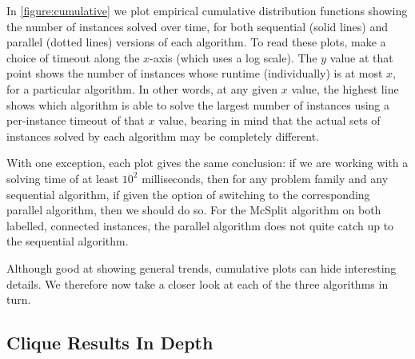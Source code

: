 \documentclass{llncs}
\begin{document}
In \cref{figure:cumulative} we plot empirical cumulative distribution functions showing the number
of instances solved over time, for both sequential (solid lines) and parallel (dotted lines)
versions of each algorithm. To read these plots, make a choice of timeout along the $x$-axis (which
uses a log scale). The $y$ value at that point shows the number of instances whose runtime
(individually) is at most $x$, for a particular algorithm. In other words, at any given $x$ value,
the highest line shows which algorithm is able to solve the largest number of instances using a
per-instance timeout of that $x$ value, bearing in mind that the actual sets of instances solved by
each algorithm may be completely different.

With one exception, each plot gives the same conclusion: if we are working with a solving time of at
least $10^2$ milliseconds, then for any problem family and any sequential algorithm, if given the
option of switching to the corresponding parallel algorithm, then we should do so. For the McSplit
algorithm on both labelled, connected instances, the parallel algorithm does not quite catch up to
the sequential algorithm.

Although good at showing general trends, cumulative plots can hide interesting details. We therefore
now take a closer look at each of the three algorithms in turn.

\subsection{Clique Results In Depth}
\end{document}

